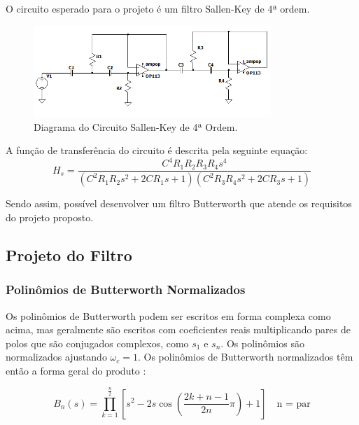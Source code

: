 \documentclass[
	12pt,				%
	openright,			%
	twoside,			%
	a4paper,			%
	english,			%
	french,				%
	spanish,			%
	brazil,				%
	]{abntex2}
\begin{document}
\clearpage

O circuito esperado para o projeto é um filtro Sallen-Key de 4ª ordem.

\begin{figure}[H]
\centering
\includegraphics[width=0.8\textwidth]{imgs/sallen-key_de_quarta_ordem.png}
\caption{Diagrama do Circuito Sallen-Key de 4ª Ordem.}
\label{fig:sallen_key_4th_order}
\end{figure}

A função de transferência do circuito é descrita pela seguinte equação:
\begin{equation}
    H_{s} = \frac{C^{4} R_{1} R_{2} R_{3} R_{4} s^{4}}{\left(C^{2} R_{1} R_{2} s^{2} + 2 C R_{1} s + 1\right) \left(C^{2} R_{3} R_{4} s^{2} + 2 C R_{3} s + 1\right)}
    \label{eq:second_transfer_function}
\end{equation}

Sendo assim, possível desenvolver um filtro Butterworth que atende os requisitos do projeto proposto.

\subsection{Projeto do Filtro}

\subsubsection*{Polinômios de Butterworth Normalizados}

Os polinômios de Butterworth podem ser escritos em forma complexa como acima, mas geralmente são escritos com coeficientes reais multiplicando pares de polos que são conjugados complexos, como $s_1$ e $s_n$. Os polinômios são normalizados ajustando $\omega_c = 1$. Os polinômios de Butterworth normalizados têm então a forma geral do produto \cite{kuo1966network}:

\begin{equation}
B_n(s) = \prod_{k=1}^{\frac{n}{2}} \left[s^2 - 2s \cos\left(\frac{2k + n - 1}{2n}\pi\right) + 1\right] \quad \text{n = par}
\end{equation}
\end{document}
